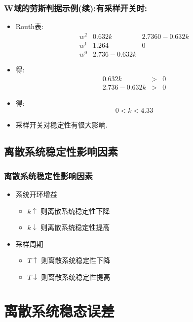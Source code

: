 \documentclass[table]{beamer}
\begin{document}
\begin{frame}
\frametitle{W域的劳斯判据示例(续):有采样开关时:}
\label{sec-5-2-4}

\begin{itemize}
\item Routh表:
      \[\begin{matrix}
      w^2 & 0.632k & 2.7360-0.632k \\
      w^1 & 1.264  & 0 \\
      w^0 & 2.736-0.632k
      \end{matrix}\]
\item 得:
      \begin{eqnarray*}
      0.632k &>  & 0\\
      2.736-0.632k& >& 0
      \end{eqnarray*}
\item 得:  
      \[0<k<4.33\]
\item <2->采样开关对稳定性有很大影响.
\end{itemize}
\end{frame}
\subsection{离散系统稳定性影响因素}
\label{sec-5-3}
\begin{frame}
\frametitle{离散系统稳定性影响因素}
\label{sec-5-3-1}

\begin{itemize}
\item <2->系统开环增益
\begin{itemize}
\item $k\uparrow$  则离散系统稳定性下降
\item $k\downarrow$  则离散系统稳定性提高
\end{itemize}
\item <3->采样周期
\begin{itemize}
\item $T\uparrow$  则离散系统稳定性下降
\item $T\downarrow$  则离散系统稳定性提高
\end{itemize}
\end{itemize}
\end{frame}
\section{离散系统稳态误差}
\label{sec-6}
\end{document}
